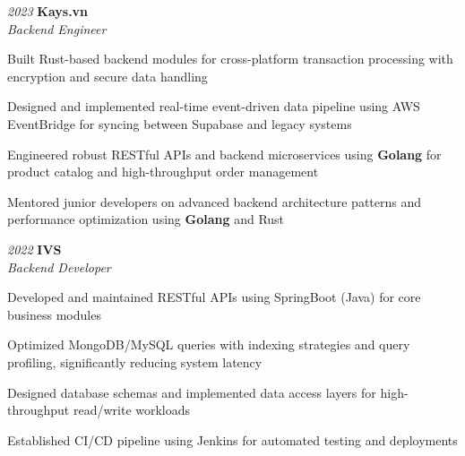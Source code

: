 \begin{twocolentry}{\textit{2023}}
    \textbf{Kays.vn} \\[4pt]
    \textit{Backend Engineer}
\end{twocolentry}
\begin{onecolentry}
    \begin{highlights}
        \item Built Rust-based backend modules for cross-platform transaction processing with encryption and secure data handling
        \item Designed and implemented real-time event-driven data pipeline using AWS EventBridge for syncing between Supabase and legacy systems
        \item Engineered robust RESTful APIs and backend microservices using \textbf{Golang} for product catalog and high-throughput order management
        \item Mentored junior developers on advanced backend architecture patterns and performance optimization using \textbf{Golang} and Rust
    \end{highlights}
\end{onecolentry}
\vspace{0.2 cm}

\begin{twocolentry}{\textit{2022}}
    \textbf{IVS} \\[4pt]
    \textit{Backend Developer}
\end{twocolentry}
\begin{onecolentry}
    \begin{highlights}
        \item Developed and maintained RESTful APIs using SpringBoot (Java) for core business modules
        \item Optimized MongoDB/MySQL queries with indexing strategies and query profiling, significantly reducing system latency
        \item Designed database schemas and implemented data access layers for high-throughput read/write workloads
        \item Established CI/CD pipeline using Jenkins for automated testing and deployments
    \end{highlights}
\end{onecolentry}


